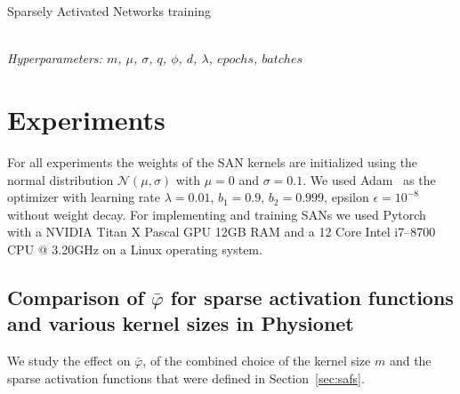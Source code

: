 \documentclass[journal]{IEEEtran}
\begin{document}
\begin{algorithm}[H]
	\caption{Sparsely Activated Networks training}\label{alg:training}
	\begin{algorithmic}[1]
		\renewcommand{\algorithmicrequire}{\textbf{Input:}}
		\renewcommand{\algorithmicensure}{\textbf{Output:}}
		\\ \textit{Hyperparameters:  $m$, $\mu$, $\sigma$, $q$, $\phi$, $d$, $\lambda$, $epochs$, $batches$}
		\ENDFOR{}
		\ENDFOR{}
		\ENDFOR{}
		\ENDFOR{}
	\end{algorithmic}
\end{algorithm}

\section{Experiments}\label{sec:experiments}
For all experiments the weights of the SAN kernels are initialized using the normal distribution $\mathcal{N}(\mu, \sigma)$ with $\mu=0$ and $\sigma=0.1$.
We used Adam~\cite{kingma2014adam} as the optimizer with learning rate $\lambda=0.01$, $b_1=0.9$, $b_2=0.999$, epsilon $\epsilon=10^{-8}$ without weight decay.
For implementing and training SANs we used Pytorch~\cite{paszke2017automatic} with a NVIDIA Titan X Pascal GPU 12GB RAM and a 12 Core Intel i7--8700 CPU @ 3.20GHz on a Linux operating system.

\subsection{Comparison of $\bar\varphi$ for sparse activation functions and various kernel sizes in Physionet}
We study the effect on $\bar\varphi$, of the combined choice of the kernel size $m$ and the sparse activation functions that were defined in Section~\ref{sec:safs}.
\end{document}
